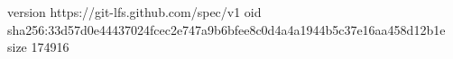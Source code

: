 version https://git-lfs.github.com/spec/v1
oid sha256:33d57d0e44437024fcec2e747a9b6bfee8c0d4a4a1944b5c37e16aa458d12b1e
size 174916
